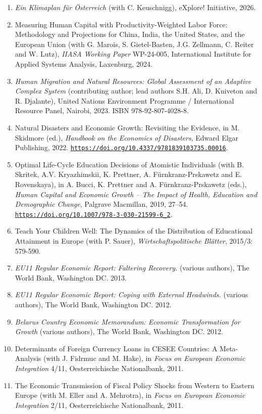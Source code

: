 \documentclass[10pt]{res} %
\newcommand{\doiurl}[1]{\href{https://doi.org/#1}{\nolinkurl{https://doi.org/#1}}}
\begin{document}
\begin{resume}
\begin{enumerate}
\item \textit{Ein Klimaplan f\"ur \"Osterreich} (with C. Keuschnigg), eXplore! Initiative, 2026.
\item Measuring Human Capital with Productivity-Weighted Labor Force: Methodology and Projections for China, India, the United States, and the European Union (with G. Marois, S. Gietel-Basten, J.G. Zellmann, C. Reiter and W. Lutz), \textit{IIASA Working Paper} WP-24-005, International Institute for Applied Systems Analysis, Laxenburg, 2024.
\item \textit{Human Migration and Natural Resources: Global Assessment of an Adaptive Complex System} (contributing author; lead authors S.H. Ali, D. Kniveton and R. Djalante), United Nations Environment Programme / International Resource Panel, Nairobi, 2023. ISBN 978-92-807-4028-8.
\item Natural Disasters and Economic Growth: Revisiting the Evidence, in M. Skidmore (ed.), \textit{Handbook on the Economics of Disasters}, Edward Elgar Publishing, 2022. \doiurl{10.4337/9781839103735.00016}.
\item Optimal Life-Cycle Education Decisions of Atomistic Individuals (with B. Skritek, A.V. Kryazhimskii, K. Prettner, A. F\"urnkranz-Prskawetz and E. Rovenskaya), in A. Bucci, K. Prettner and A. F\"urnkranz-Prskawetz (eds.), \textit{Human Capital and Economic Growth -- The Impact of Health, Education and Demographic Change}, Palgrave Macmillan, 2019, 27--54. \doiurl{10.1007/978-3-030-21599-6_2}.
\item Teach Your Children Well: The Dynamics of the Distribution of Educational Attainment in Europe (with P. Sauer),\textit{ Wirtschaftspolitische Bl\"atter}, 2015/3: 579-590.
\item \textit{EU11 Regular Economic Report: Faltering Recovery.} (various authors), The World Bank, Washington DC. 2013.
\item \textit{EU11 Regular Economic Report: Coping with External Headwinds.} (various authors), The World Bank, Washington DC. 2012.
\item \textit{Belarus Country Economic Memorandum: Economic Transformation for Growth} (various authors), The World Bank, Washington DC. 2012.
\item Determinants of Foreign Currency Loans in CESEE Countries: A Meta-Analysis (with J. Fidrmuc and M. Hake), in \textit{Focus on European Economic Integration} 4/11, Oesterreichische Nationalbank, 2011.
\item The Economic Transmission of Fiscal Policy Shocks from Western to Eastern Europe (with M. Eller and A. Mehrotra), in \textit{Focus on European Economic Integration} 2/11, Oesterreichische Nationalbank, 2011.

\end{enumerate}
\end{resume}
\end{document}
